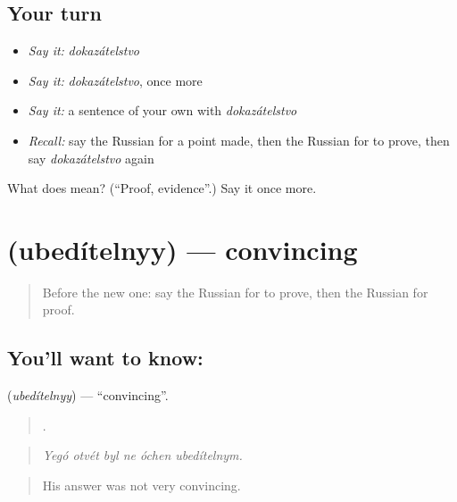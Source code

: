 \subsection*{Your turn}
\begin{itemize}
\raggedright
  \item \emph{Say it:} \emph{dokazátelstvo}
  \item \emph{Say it:} \emph{dokazátelstvo}, once more
  \item \emph{Say it:} a sentence of your own with \emph{dokazátelstvo}
  \item \emph{Recall:} say the Russian for a point made, then the Russian for to prove, then say \emph{dokazátelstvo} again
\end{itemize}

\begin{tcolorbox}[breakable,colback=teal!4,colframe=teal!35!black,title={Before you move on}]
What does  mean? (\textquotedblleft{}Proof, evidence\textquotedblright{}.) Say it once more.
\end{tcolorbox}
\section[\texorpdfstring{\ru{убедительный} (ubedítelnyy)}{убедительный (ubedítelnyy)}]{ (ubedítelnyy) — convincing}

\label{lesson:RU-C338-ubeditelnyy}



\begin{quote}
Before the new one: say the Russian for to prove, then the Russian for proof.
\end{quote}

\subsection*{You'll want to know: }
\textbf{} (\emph{ubedítelnyy}) — \textquotedblleft{}convincing\textquotedblright{}.

\begin{quote}
     .
\end{quote}

\begin{quote}
\emph{Yegó otvét byl ne óchen ubedítelnym.}
\end{quote}

\begin{quote}
His answer was not very convincing.
\end{quote}

